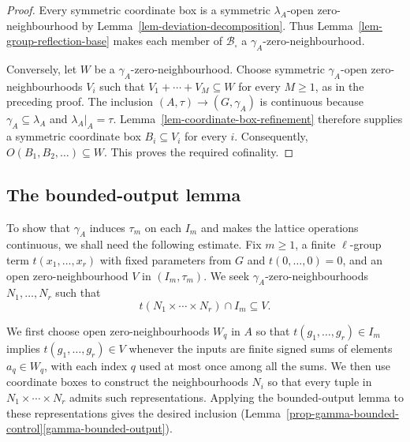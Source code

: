 \documentclass[preprint,3p]{elsarticle}
\theoremstyle{plain}
\theoremstyle{definition}
\numberwithin{equation}{section}
\begin{document}
\begin{proof}
Every symmetric coordinate box is a symmetric $\lambda_A$-open
zero-neighbourhood by Lemma~\ref{lem-deviation-decomposition}.
Thus Lemma~\ref{lem-group-reflection-base} makes each member of
$\mathcal B_\square$ a $\gamma_A$-zero-neighbourhood.

Conversely, let $W$ be a $\gamma_A$-zero-neighbourhood.
Choose symmetric $\gamma_A$-open zero-neighbourhoods $V_i$ such that
$V_1+\cdots+V_M\subseteq W$ for every $M\geq1$, as in the preceding
proof.  The inclusion $(A,\tau)\longrightarrow(G,\gamma_A)$ is
continuous because $\gamma_A\subseteq\lambda_A$ and
$\lambda_A|_A=\tau$.  Lemma~\ref{lem-coordinate-box-refinement}
therefore supplies a symmetric coordinate box $B_i\subseteq V_i$
for every $i$.  Consequently,
$O(B_1,B_2,\ldots)\subseteq W$.
This proves the required cofinality.
\end{proof}

\subsection{The bounded-output lemma}
\label{subsec-group-reflection}

To show that $\gamma_A$ induces $\tau_m$ on each $I_m$ and makes
the lattice operations continuous, we shall need the following
estimate.  Fix $m\geq1$, a finite $\ell$-group term
$t(x_1,\ldots,x_r)$ with fixed parameters from $G$ and
$t(0,\ldots,0)=0$, and an open zero-neighbourhood $V$ in $(I_m,\tau_m)$.
We seek $\gamma_A$-zero-neighbourhoods $N_1,\ldots,N_r$ such that
\[
 t(N_1\times\cdots\times N_r)\cap I_m\subseteq V.
\]

We first choose open zero-neighbourhoods $W_q$ in $A$ so that
$t(g_1,\ldots,g_r)\in I_m$ implies $t(g_1,\ldots,g_r)\in V$
whenever the inputs are finite signed sums of elements
$a_q\in W_q$, with each index $q$ used at most once among all the sums.
We then use coordinate boxes to construct the neighbourhoods $N_i$
so that every tuple in $N_1\times\cdots\times N_r$ admits such
representations.  Applying the bounded-output lemma to these representations
gives the desired inclusion
(Lemma~\ref{prop-gamma-bounded-control}\ref{gamma-bounded-output}).
\end{document}
